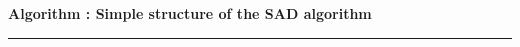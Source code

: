 \documentclass[12pt]{article}
\begin{document}
\par\medskip
{}
\noindent\textbf{Algorithm \thealgorithm: Simple structure of the SAD
algorithm}\label{algo:simple}
\par\smallskip\hrule\smallskip
\begingroup\scriptsize
%
%
%
\end{document}
